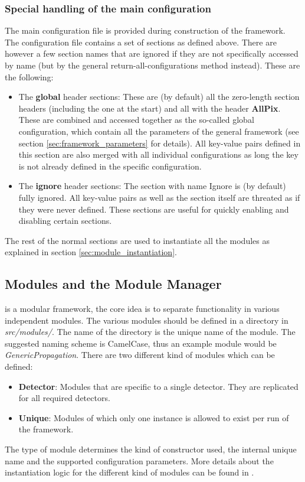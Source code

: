 \subsubsection{Special handling of the main configuration}
The main configuration file is provided during construction of the framework. The configuration file contains a set of sections as defined above. There are however a few section names that are ignored if they are not specifically accessed by name (but by the general return-all-configurations method instead). These are the following:
\begin{itemize}
\item The \textbf{global} header sections: These are (by default) all the zero-length section headers (including the one at the start) and all with the header \textbf{AllPix}. These are combined and accessed together as the so-called global configuration, which contain all the parameters of the general framework (see section \ref{sec:framework_parameters} for details). All key-value pairs defined in this section are also merged with all individual configurations as long the key is not already defined in the specific configuration.
\item The \textbf{ignore} header sections: The section with name Ignore is (by default) fully ignored. All key-value pairs as well as the section itself are threated as if they were never defined. These sections are useful for quickly enabling and disabling certain sections.
\end{itemize}

The rest of the normal sections are used to instantiate all the modules as explained in section \ref{sec:module_instantiation}.

\subsection{Modules and the Module Manager}
\label{sec:module_manager}
\apsq is a modular framework, the core idea is to separate functionality in various independent modules. The various modules should be defined in a directory in \textit{src/modules/}. The name of the directory is the unique name of the module. The suggested naming scheme is CamelCase, thus an example module would be \textit{GenericPropagation}. There are two different kind of modules which can be defined:
\begin{itemize}
\item \textbf{Detector}: Modules that are specific to a single detector. They are replicated for all required detectors.
\item \textbf{Unique}: Modules of which only one instance is allowed to exist per run of the framework.
\end{itemize}
The type of module determines the kind of constructor used, the internal unique name and the supported configuration parameters. More details about the instantiation logic for the different kind of modules can be found in \needref.

